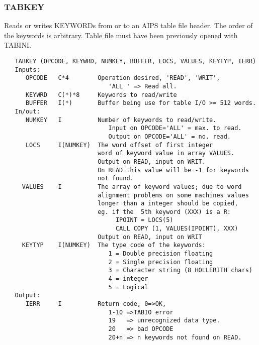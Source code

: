 \subsubsection{TABKEY}
Reads or writes KEYWORDs from or to an AIPS table file header.  The
order of the keywords is arbitrary. Table file must have been
previously opened with TABINI.
\begin{verbatim}
   TABKEY (OPCODE, KEYWRD, NUMKEY, BUFFER, LOCS, VALUES, KEYTYP, IERR)
   Inputs:
      OPCODE   C*4        Operation desired, 'READ', 'WRIT',
                             'ALL ' => Read all.
      KEYWRD   C(*)*8     Keywords to read/write
      BUFFER   I(*)       Buffer being use for table I/O >= 512 words.
   In/out:
      NUMKEY   I          Number of keywords to read/write.
                             Input on OPCODE='ALL' = max. to read.
                             Output on OPCODE='ALL' = no. read.
      LOCS     I(NUMKEY)  The word offset of first integer
                          word of keyword value in array VALUES.
                          Output on READ, input on WRIT.
                          On READ this value will be -1 for keywords
                          not found.
     VALUES    I          The array of keyword values; due to word
                          alignment problems on some machines values
                          longer than a integer should be copied,
                          eg. if the  5th keyword (XXX) is a R:
                               IPOINT = LOCS(5)
                               CALL COPY (1, VALUES(IPOINT), XXX)
                          Output on READ, input on WRIT
     KEYTYP    I(NUMKEY)  The type code of the keywords:
                             1 = Double precision floating
                             2 = Single precision floating
                             3 = Character string (8 HOLLERITH chars)
                             4 = integer
                             5 = Logical
   Output:
      IERR     I          Return code, 0=>OK,
                             1-10 =>TABIO error
                             19   => unrecognized data type.
                             20   => bad OPCODE
                             20+n => n keywords not found on READ.
\end{verbatim}

